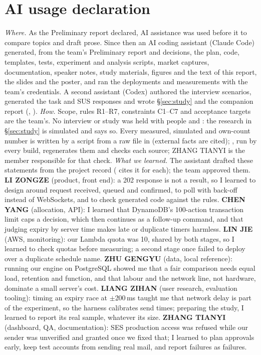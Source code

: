 \section*{AI usage declaration}
\emph{Where.} As the Preliminary report declared, AI assistance was used before it to compare
topics and draft prose. Since then an AI coding assistant (Claude Code) generated, from the team's
Preliminary report and decisions, the plan, code, templates, tests, experiment and analysis scripts,
market captures, documentation, speaker notes, study materials, figures and the text of this report,
the slides and the poster, and ran the deployments and measurements with the team's credentials. A
second assistant (Codex) authored the interview scenarios, generated the task and SUS responses and
wrote \S\ref{sec:study} and the companion report (, ).
\emph{How.} Scope, rules R1--R7, constraints C1--C7 and acceptance targets are the team's. No
interview or study was held with people and : the research in \S\ref{sec:study} is simulated and says so. Every measured, simulated
and own-count number is written by a script from a raw file in  (external facts are
cited); , run by every build, regenerates them and checks each
source; ZHANG TIANYI is the member responsible for that check. \emph{What we learned.} The assistant drafted these statements
from the project record ( cites it for each); the team approved
them. \textbf{LI ZONGZE} (product, front end): a 202 response is not a result, so I learned to design around
request received, queued and confirmed, to poll with back-off instead of WebSockets, and to check
generated code against the rules. \textbf{CHEN YANG} (allocation, API): I learned that DynamoDB's
100-action transaction limit caps a decision, which then continues as a follow-up command, and that
judging expiry by server time makes late or duplicate timers harmless. \textbf{LIN JIE} (AWS,
monitoring): our Lambda quota was 10, shared by both stages, so I learned to check quotas before
measuring; a second stage once failed to deploy over a duplicate schedule name. \textbf{ZHU
GENGYU} (data, local reference): running our engine on PostgreSQL showed me that a fair comparison
needs equal load, retention and function, and that labour and the network line, not hardware, dominate a small server's cost. \textbf{LIANG ZIHAN} (user research, evaluation tooling): timing
an expiry race at $\pm$200\,ms taught me that network delay is part of the experiment, so the harness
calibrates send times; preparing the study, I learned to report its real sample, whatever its size. \textbf{ZHANG
TIANYI} (dashboard, QA, documentation): SES production access was refused while our sender was unverified and granted once we fixed that; I learned to plan approvals early, keep test accounts from sending real mail, and report failures as failures.
